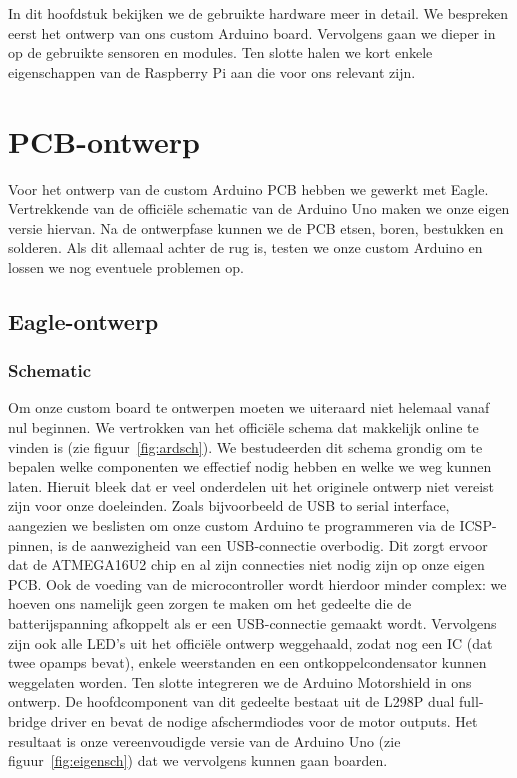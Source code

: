 In dit hoofdstuk bekijken we de gebruikte hardware meer in detail. We bespreken eerst het ontwerp van ons custom Arduino board. Vervolgens gaan we dieper in op de gebruikte sensoren en modules. Ten slotte halen we kort enkele eigenschappen van de Raspberry Pi aan die voor ons relevant zijn.

\section{PCB-ontwerp}
Voor het ontwerp van de custom Arduino PCB hebben we gewerkt met Eagle. Vertrekkende van de offici\"{e}le schematic van de Arduino Uno maken we onze eigen versie hiervan. Na de ontwerpfase kunnen we de PCB etsen, boren, bestukken en solderen. Als dit allemaal achter de rug is, testen we onze custom Arduino en lossen we nog eventuele problemen op. 
\subsection{Eagle-ontwerp}
\subsubsection{Schematic}
Om onze custom board te ontwerpen moeten we uiteraard niet helemaal vanaf nul beginnen. We vertrokken van het offici\"{e}le schema dat makkelijk online te vinden is (zie figuur~\vref{fig:ardsch}). We bestudeerden dit schema grondig om te bepalen welke componenten we effectief nodig hebben en welke we weg kunnen laten. Hieruit bleek dat er veel onderdelen uit het originele ontwerp niet vereist zijn voor onze doeleinden. Zoals bijvoorbeeld de USB to serial interface, aangezien we beslisten om onze custom Arduino te programmeren via de ICSP-pinnen, is de aanwezigheid van een USB-connectie overbodig. Dit zorgt ervoor dat de ATMEGA16U2 chip en al zijn connecties niet nodig zijn op onze eigen PCB. Ook de voeding van de microcontroller wordt hierdoor minder complex: we hoeven ons namelijk geen zorgen te maken om het gedeelte die de batterijspanning afkoppelt als er een USB-connectie gemaakt wordt. Vervolgens zijn ook alle LED's uit het offici\"{e}le ontwerp weggehaald, zodat nog een IC (dat twee opamps bevat), enkele weerstanden en een ontkoppelcondensator kunnen weggelaten worden. Ten slotte integreren we de Arduino Motorshield in ons ontwerp. De hoofdcomponent van dit gedeelte bestaat uit de L298P dual full-bridge driver en bevat de nodige afschermdiodes voor de motor outputs. Het resultaat is onze vereenvoudigde versie van de Arduino Uno (zie figuur~\vref{fig:eigensch}) dat we vervolgens kunnen gaan boarden.

